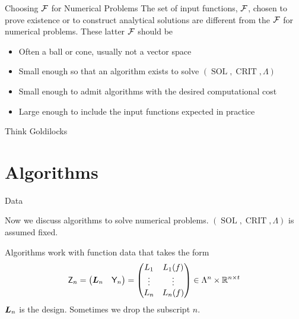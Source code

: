 \documentclass[10pt,compress,xcolor={usenames,dvipsnames},aspectratio=169]{beamer}
\DeclareMathOperator{\SOL}{SOL}
\DeclareMathOperator{\CRIT}{CRIT}
\begin{document}
\begin{frame}{Choosing $\mathcal{F}$ for Numerical Problems}
	\vspace{-5ex}
	The set of input functions, $\mathcal{F}$, chosen to prove \alert{existence} or to construct \alert{analytical solutions} are different from the $\mathcal{F}$ for numerical problems.  These latter $\mathcal{F}$ should be
	\begin{itemize}
		\item Often a \alert{ball} or \alert{cone}, usually not a vector space
		\item Small enough so that an algorithm \alert{exists} to solve $(\SOL,\CRIT,\Lambda)$
		\item Small enough to admit algorithms with the desired  \alert{computational cost}
		\item Large enough to include the input functions  expected in \alert{practice}
	\end{itemize}
Think \alert{Goldilocks}
	
\end{frame}


\section{Algorithms}


\begin{frame}{Data}
	
	\vspace{-5ex}
	Now we discuss \alert{algorithms} to solve numerical problems.
	$(\SOL, \CRIT, \Lambda)$ is assumed fixed.
	
	Algorithms work with function data that takes the form
	\[
	\mathsf{Z}_n 
	= \begin{pmatrix} \boldsymbol{L}_n & \mathsf{Y}_n \end{pmatrix}
	=  \begin{pmatrix} L_{1} & L_{1}(f) \\ \vdots & \vdots \\ L_{n} & L_{n}(f) \end{pmatrix} 
	\in \Lambda^n \times \mathbb{R}^{n\times t}
	\]
	$\boldsymbol{L}_n$ is the \alert{design}.  Sometimes we drop the subscript $n$.
	
	
	
\end{frame}
\end{document}
